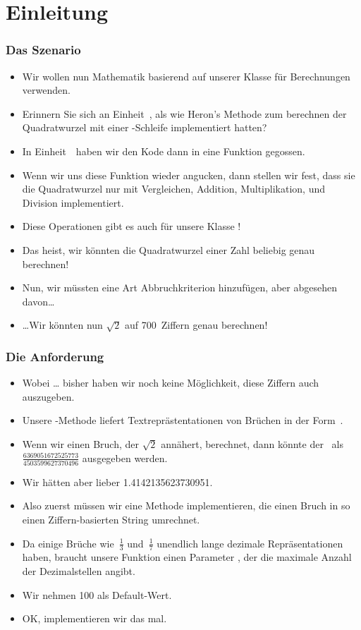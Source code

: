 \documentclass[aspectratio=169,mathserif,notheorems]{beamer}%
\subtitle{47.~Zwischenspiel: Debugger}%
\begin{document}
%
%
\startPresentation%
%
\section{Einleitung}%
\begin{frame}[t]%
\frametitle{Das Szenario}%
\begin{itemize}%
%
\item Wir wollen nun Mathematik basierend auf unserer Klasse  für  Berechnungen verwenden.%
%
\item<2-> Erinnern Sie sich an Einheit~\unitSqrtHeron, als wie Heron's Methode zum berechnen der Quadratwurzel mit einer -Schleife implementiert hatten?%
%
\item<3-> In Einheit~\unitFunctionsInModules\ haben wir den Kode dann in eine Funktion gegossen.%
%
\item<4-> Wenn wir uns diese Funktion wieder angucken, dann stellen wir fest, dass sie die Quadratwurzel nur mit Vergleichen, Addition, Multiplikation, und Division implementiert.%
%
\item<5-> Diese Operationen gibt es auch für unsere Klasse !%
%
\item<6-> Das heist, wir könnten die Quadratwurzel einer Zahl beliebig genau berechnen!%
%
\item<7-> Nun, wir müssten eine Art Abbruchkriterion hinzufügen, aber abgesehen davon{\dots}%
%
\item<8-> {\dots}Wir könnten nun $\sqrt{2}$ auf 700~Ziffern genau berechnen!%
\end{itemize}%
\end{frame}%
%
\begin{frame}%
\frametitle{Die Anforderung}%
\begin{itemize}%
\item Wobei {\dots} bisher haben wir noch keine Möglichkeit, diese Ziffern auch auszugeben.%
%
\item<2-> Unsere -Methode liefert Textreprästentationen von Brüchen in der Form~.%
%
\item<3-> Wenn wir einen Bruch, der $\sqrt{2}$ annähert, berechnet, dann könnte der \DEzB\ als $\frac{6369051672525773}{4503599627370496}$ ausgegeben werden.%
%
\item<4-> Wir hätten aber lieber 1.4142135623730951.%
%
\item<5-> Also zuerst müssen wir eine Methode  implementieren, die einen Bruch in so einen Ziffern-basierten String umrechnet.%
%
\item<6-> Da einige Brüche wie~$\frac{1}{3}$ und~$\frac{1}{7}$ unendlich lange dezimale Repräsentationen haben, braucht unsere Funktion einen Parameter , der die maximale Anzahl der Dezimalstellen angibt.%
%
\item<7-> Wir nehmen 100 als Default-Wert.%
%
\item<8-> OK, implementieren wir das mal.%
\end{itemize}%
\end{frame}%
%
\end{document}
